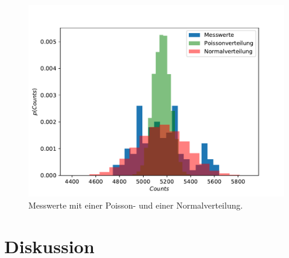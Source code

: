 \begin{figure}
  \centering
  \includegraphics[scale=0.6]{Statistik.pdf}
  \caption{Messwerte mit einer Poisson- und einer Normalverteilung.}
  \label{abb:4}
\end{figure}

\section{Diskussion}
